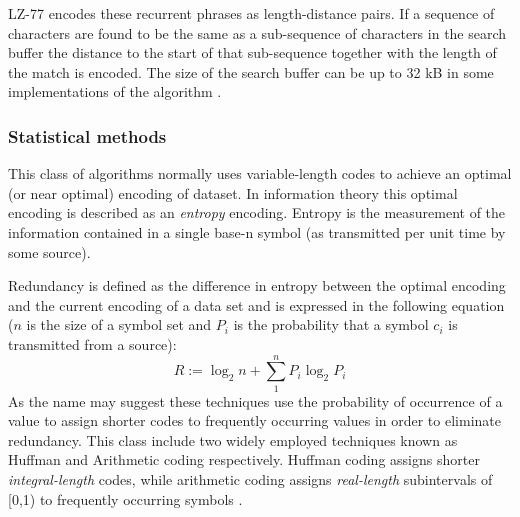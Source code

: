 LZ-77 encodes these recurrent phrases as length-distance pairs. If a sequence of characters are found to be the same as a sub-sequence of characters in the search buffer the 
distance to the start of that sub-sequence together with the length of the match is encoded. The size of the search buffer can be up to 32 kB in some implementations of the 
algorithm \cite[ch. 3]{salomon2004data}.
\subsubsection{Statistical methods}
This class of algorithms normally uses variable-length codes to achieve an optimal (or near optimal) encoding of dataset. In information theory this optimal encoding is 
described as an \textit{entropy} encoding. Entropy is the measurement of the information contained in a single base-n symbol (as transmitted per unit time by some source).

Redundancy is defined as the difference in entropy between the optimal encoding and the current encoding of a data set and is expressed in the following equation  
($n$ is the size of a symbol set and $P_{i}$ is the probability that a symbol $c_{i}$ is transmitted from a source)\cite[p. 46 - 47]{salomon2004data}:
\begin{equation}
 R := \log_2n + \sum_1^nP_i\log_2P_i
\end{equation}
As the name may suggest these techniques use the probability of occurrence of a value to assign shorter codes to frequently occurring values in order to eliminate redundancy. This 
class include two widely employed techniques known as Huffman and Arithmetic coding respectively. Huffman coding assigns shorter \textit{integral-length} codes, while arithmetic 
coding assigns \textit{real-length} subintervals of [0,1) to frequently occurring symbols \cite{Witten:1987:ACD:214762.214771}\cite[ch. 2]{salomon2004data}.

